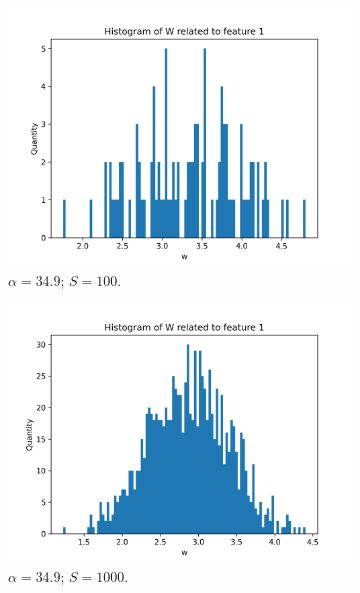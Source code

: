 \documentclass{article}
\begin{document}
\begin{figure}
\begin{subfigure}[t]{0.24\textwidth}
    \includegraphics[width=\linewidth]{hist_feat0_349000000_sample_100.png}
    \caption{$\alpha = 34.9$; $S = 100$.}
  \end{subfigure}
  \hfill
  \begin{subfigure}[t]{0.24\textwidth}
    \centering
    \includegraphics[width=\linewidth]{hist_feat0_349000000_sample_1000.png}
    \caption{$\alpha = 34.9$; $S = 1000$.}
  \end{subfigure}
  \hfill
  \begin{subfigure}[t]{0.24\textwidth}
    \centering

\end{subfigure}
\end{figure}
\end{document}

